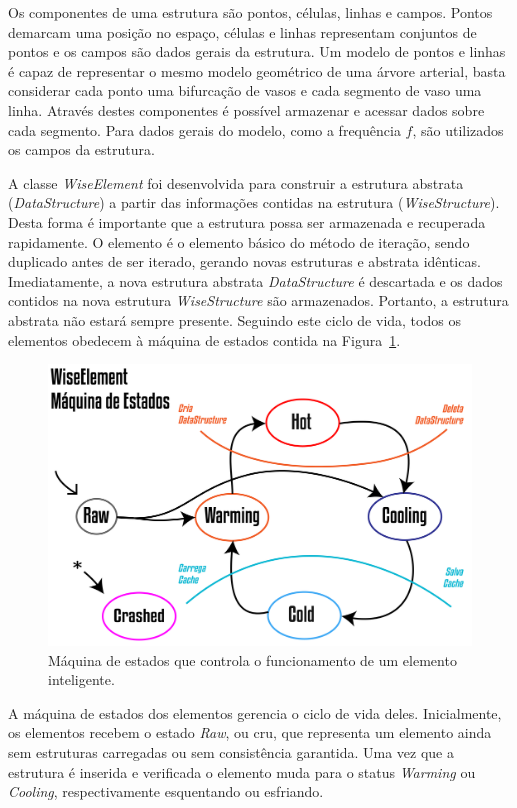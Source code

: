Os componentes de uma estrutura são pontos, células, linhas e campos. Pontos demarcam uma posição no espaço, células e linhas representam conjuntos de pontos e os campos são dados gerais da estrutura. Um modelo de pontos e linhas é capaz de representar o mesmo modelo geométrico de uma árvore arterial, basta considerar cada ponto uma bifurcação de vasos e cada segmento de vaso uma linha. Através destes componentes é possível armazenar e acessar dados sobre cada segmento. Para dados gerais do modelo, como a frequência $f$, são utilizados os campos da estrutura.

A classe \textit{WiseElement} foi desenvolvida para construir a estrutura abstrata (\textit{DataStructure}) a partir das informações contidas na estrutura (\textit{WiseStructure}). Desta forma é importante que a estrutura possa ser armazenada e recuperada rapidamente. O elemento é o elemento básico do método de iteração, sendo duplicado antes de ser iterado, gerando novas estruturas e abstrata idênticas. Imediatamente, a nova estrutura abstrata \textit{DataStructure} é descartada e os dados contidos na nova estrutura \textit{WiseStructure} são armazenados. Portanto, a estrutura abstrata não estará sempre presente. Seguindo este ciclo de vida, todos os elementos obedecem à máquina de estados contida na Figura~\ref{fig3:wiselementstatus}.

\begin{figure}[!htbp]
	\centering
	\includegraphics[scale=1.5]{Figures/WiseElementStatus@16x.png}
	\caption{Máquina de estados que controla o funcionamento de um elemento inteligente.}
	\label{fig3:wiselementstatus}
\end{figure}

A máquina de estados dos elementos gerencia o ciclo de vida deles. Inicialmente, os elementos recebem o estado \textit{Raw}, ou cru, que representa um elemento ainda sem estruturas carregadas ou sem consistência garantida. Uma vez que a estrutura é inserida e verificada o elemento muda para o status \textit{Warming} ou \textit{Cooling}, respectivamente esquentando ou esfriando.

